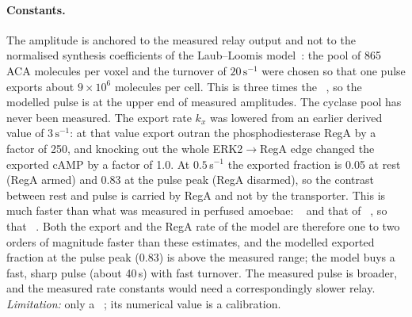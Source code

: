 \paragraph{Constants.}
The amplitude is anchored to the measured relay output and not to the normalised synthesis coefficients of the Laub--Loomis model~\cite{laub1998}: the pool of 865 ACA molecules per voxel and the turnover of $20\,\mathrm{s^{-1}}$ were chosen so that one pulse exports about $9\times10^{6}$ molecules per cell.
This is three times the ~\cite{devreotes1979}, so the modelled pulse is at the upper end of measured amplitudes.
The cyclase pool has never been measured.
The export rate $k_x$ was lowered from an earlier derived value of $3\,\mathrm{s^{-1}}$: at that value export outran the phosphodiesterase RegA by a factor of 250, and knocking out the whole ERK2$\to$RegA edge changed the exported cAMP by a factor of 1.0.
At $0.5$\,s$^{-1}$ the exported fraction is 0.05 at rest (RegA armed) and 0.83 at the pulse peak (RegA disarmed), so the contrast between rest and pulse is carried by RegA and not by the transporter.
This is much faster than what was measured in perfused amoebae: ~\cite{dinauer1980} and that of ~\cite{dinauer1980}, so that ~\cite{dinauer1980}.
Both the export and the RegA rate of the model are therefore one to two orders of magnitude faster than these estimates, and the modelled exported fraction at the pulse peak (0.83) is above the measured range; the model buys a fast, sharp pulse (about 40\,s) with fast turnover. The measured pulse is broader, and the measured rate constants would need a correspondingly slower relay.
\emph{Limitation:} only a ~\cite{dinauer1980}; its numerical value is a calibration.

